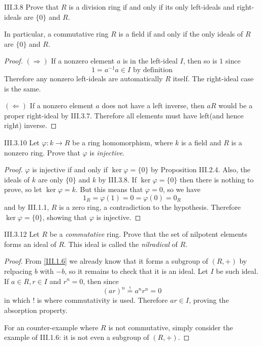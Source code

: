 \begin{problem}{III.3.8}
Prove that $R$ is a division ring if and only if its only left-ideals and right-ideals are $\{0\}$ and $R$.

In particular, a commutative ring $R$ is a field if and only if the only ideals of $R$ are $\{0\}$ and $R$.
\end{problem}
\begin{proof}

\noindent $(\Rightarrow)$ If a nonzero element $a$ is in the left-ideal $I$, then so is $1$ since 
\[
1 = a^{-1}a \in I \text{ by definition}
\] 
Therefore any nonzero left-ideals are automatically $R$ itself. The right-ideal case is the same.

\noindent $(\Leftarrow)$ If a nonzero element $a$ does not have a left inverse, then $aR$ would be a proper right-ideal by III.3.7. Therefore all elements must have left(and hence right) inverse.
\end{proof}

\begin{problem}{III.3.10}
Let $\varphi : k \to R$ be a ring homomorphism, where $k$ is a field and $R$ is a nonzero ring. Prove that $\varphi$ is \emph{injective}.
\end{problem}
\begin{proof}
$\varphi$ is injective if and only if $\ker \varphi = \{0\}$ by Proposition III.2.4. Also, the ideals of $k$ are only $\{0\}$ and $k$ by III.3.8. If $\ker \varphi = \{0\}$ then there is nothing to prove, so let $\ker \varphi = k$. But this means that $\varphi = 0$, so we have
\[
1_R = \varphi(1) = 0 = \varphi(0) = 0_R    
\]
and by III.1.1, $R$ is a zero ring, a contradiction to the hypothesis. Therefore $\ker \varphi = \{0\}$, showing that $\varphi$ is injective.
\end{proof}


\begin{problem}{III.3.12}
Let $R$ be a \emph{commutative} ring. Prove that the set of nilpotent elements forms an ideal of $R$. This ideal is called the \emph{nilradical} of $R$.
\end{problem}
\begin{proof}
From \ref{III.1.6} we already know that it forms a subgroup of $(R,+)$ by relpacing $b$ with $-b$, so it remains to check that it is an ideal. Let $I$ be such ideal. If $a \in R, r \in I$ and $r^n = 0$, then since
\[
(ar)^n \overset{!}{=} a^nr^n = 0    
\]
in which ! is where commutativity is used. Therefore $ar \in I$, proving the absorption property.

For an counter-example where $R$ is not commutative, simply consider the example of III.1.6: it is not even a subgroup of $(R, +)$.
\end{proof}

